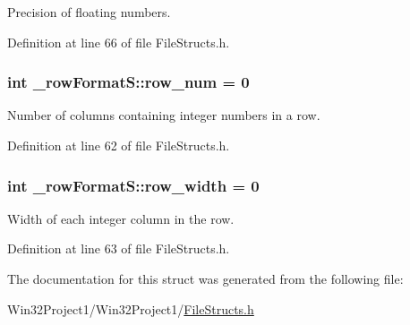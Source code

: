 Precision of floating numbers. 



Definition at line 66 of file File\+Structs.\+h.

\subsubsection[{\texorpdfstring{row\+\_\+num}{row_num}}]{\setlength{\rightskip}{0pt plus 5cm}int \+\_\+row\+Format\+S\+::row\+\_\+num = 0}\hypertarget{struct__row_format_s_ac7451588121fa109b772db97b509e734}{}\label{struct__row_format_s_ac7451588121fa109b772db97b509e734}


Number of columns containing integer numbers in a row. 



Definition at line 62 of file File\+Structs.\+h.

\subsubsection[{\texorpdfstring{row\+\_\+width}{row_width}}]{\setlength{\rightskip}{0pt plus 5cm}int \+\_\+row\+Format\+S\+::row\+\_\+width = 0}\hypertarget{struct__row_format_s_a4f667918f753a059f84301db23d70e68}{}\label{struct__row_format_s_a4f667918f753a059f84301db23d70e68}


Width of each integer column in the row. 



Definition at line 63 of file File\+Structs.\+h.



The documentation for this struct was generated from the following file\+:\begin{DoxyCompactItemize}
\item 
Win32\+Project1/\+Win32\+Project1/\hyperlink{_file_structs_8h}{File\+Structs.\+h}\end{DoxyCompactItemize}
